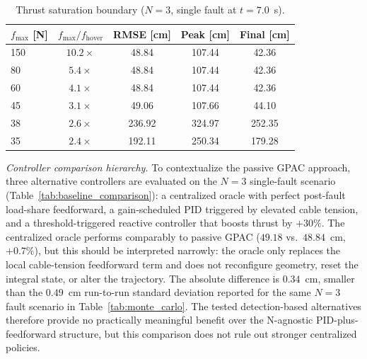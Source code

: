 \begin{table}[t]
\centering
\caption{Thrust saturation boundary ($N{=}3$, single fault at $t = 7.0$~s).}
\label{tab:fmax_boundary}
\begin{tabular}{lcccc}
\toprule
$f_{\max}$ [N] & $f_{\max}/f_{\mathrm{hover}}$ & RMSE [cm] & Peak [cm] & Final [cm] \\
\midrule
150 & $10.2\times$ & 48.84 & 107.44 & 42.36 \\
 80 & $ 5.4\times$ & 48.84 & 107.44 & 42.36 \\
 60 & $ 4.1\times$ & 48.84 & 107.44 & 42.36 \\
 45 & $ 3.1\times$ & 49.06 & 107.66 & 44.10 \\
 38 & $ 2.6\times$ & 236.92 & 324.97 & 252.35 \\
 35 & $ 2.4\times$ & 192.11 & 250.34 & 179.28 \\
\bottomrule
\end{tabular}
\end{table}

\emph{Controller comparison hierarchy.}\label{sec:baseline_comparison}
To contextualize the passive GPAC approach, three alternative controllers are evaluated on the $N{=}3$ single-fault scenario (Table~\ref{tab:baseline_comparison}): a centralized oracle with perfect post-fault load-share feedforward, a gain-scheduled PID triggered by elevated cable tension, and a threshold-triggered reactive controller that boosts thrust by $+30\%$. The centralized oracle performs comparably to passive GPAC ($49.18$ vs.\ $48.84$~cm, $+0.7\%$), but this should be interpreted narrowly: the oracle only replaces the local cable-tension feedforward term and does not reconfigure geometry, reset the integral state, or alter the trajectory. The absolute difference is $0.34$~cm, smaller than the $0.49$~cm run-to-run standard deviation reported for the same $N{=}3$ fault scenario in Table~\ref{tab:monte_carlo}. The tested detection-based alternatives therefore provide no practically meaningful benefit over the N-agnostic PID-plus-feedforward structure, but this comparison does not rule out stronger centralized policies.

